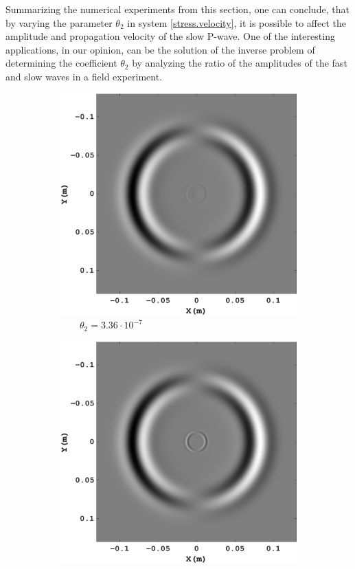 \documentclass[3p,times,table]{article}
\begin{document}
Summarizing  the numerical experiments from this section, one can conclude, 
that by varying the parameter $\theta_2$ in system \eqref{stress.velocity}, it 
is possible to affect the amplitude and  propagation velocity of the slow 
P-wave. One of the interesting applications, in our opinion, can be the 
solution of the inverse problem of determining the coefficient $\theta_2$ by 
analyzing the ratio of the amplitudes of the fast and slow waves in a field 
experiment.
\begin{figure}[!htbp]
\begin{subfigure}{0.3\linewidth}
\centering
\includegraphics[draft=false,width=1\textwidth]{Figures/Xi_11_new}
\caption{$ \quad\quad \theta_2=3.36\cdot10^{-7} $}
\end{subfigure}
\hfill
\begin{subfigure}{0.3\linewidth}
\includegraphics[draft=false,width=1\textwidth]{Figures/Xi_21_new}

\end{subfigure}
\end{figure}
\end{document}
